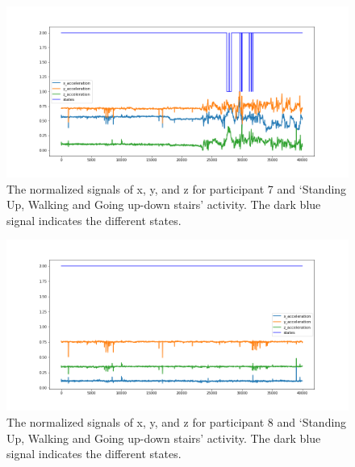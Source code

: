\begin{figure}[H]
    \centering
    \begin{minipage}[b]{1\textwidth}
        \includegraphics[width=\textwidth]{manuscript/src/figures/Ass3/Ass3_Q2_states_user_6N.png}
    \end{minipage}
    \caption{The normalized signals of x, y, and z for participant 7 and ‘Standing  Up,  Walking  and  Going  up-down  stairs’ activity. The dark blue signal indicates the different states.}
    \label{fig:Ass3_Q2_states_user_6N}
\end{figure}
\begin{figure}[H]
    \centering
    \begin{minipage}[b]{1\textwidth}
        \includegraphics[width=\textwidth]{manuscript/src/figures/Ass3/Ass3_Q2_states_user_7N.png}
    \end{minipage}
    \caption{The normalized signals of x, y, and z for participant 8 and ‘Standing  Up,  Walking  and  Going  up-down  stairs’ activity. The dark blue signal indicates the different states.}
    \label{fig:Ass3_Q2_states_user_7N}
\end{figure}
